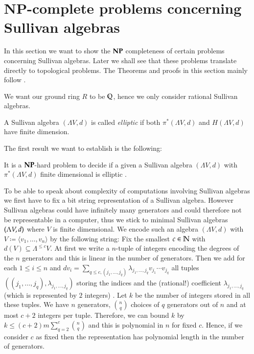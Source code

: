  \section{NP-complete problems concerning Sullivan algebras}
 
 In this section we want to show the 
 $\mathbf{NP}$ completeness of certain problems concerning Sullivan algebras. Later we shall see that these problems
 translate directly to topological problems. The Theorems and proofs in this section mainly follow  \cite{Lechuga2000}.
 
 We want our ground ring $R$ to be  $\mathbb{Q}$, hence we only consider rational Sullivan algebras.
 
 \begin{Definition}
  A Sullivan algebra $(\Lambda V, d)$ is called \emph{elliptic} if both $\pi^*(\Lambda V,d)$ and $H(\Lambda V,d)$ have
  finite dimension.
 \end{Definition}
 
 The first result we want to establish is the following:
 
 \begin{Theorem}
 \label{thm:DecidingEllipticityIsNpHard}
  It is a $\mathbf{NP}$-hard problem to decide if a given a Sullivan algebra $(\Lambda V,d)$ with $\pi^*(\Lambda V,d)$ finite dimensional 
  is elliptic . 
 \end{Theorem}
 
 \begin{Remark}
 \label{rem:CodingOfSullivanAlgebras}
  To be able to speak about complexity of computations involving Sullivan algebras we first have to fix a bit string 
  representation of a Sullivan algebra. However Sullivan algebras could have infinitely many generators and could therefore
  not be representable in a computer, thus we stick to minimal Sullivan algebras $(\Lambda V,d)$ where $V$ is finite dimensional. 
  We encode such an algebra $(\Lambda V, d)$ with $V \coloneqq \langle v_1, \ldots , v_n \rangle$
  by the following string: \newline
  Fix the smallest $c \in \mathbb{N}$ with $d(V) \subseteq \Lambda^{ \leq c} V$.
  At first we write a $n$-tuple of integers encoding the degrees of the $n$ generators and this is linear in the number
  of generators. Then we add for each $ 1 \leq i \leq n$
  and $d v_i = \sum_{q \leq c, (j_1, \ldots, j_q)} \lambda_{j_1, \ldots, j_q} v_{j_1} \cdots v_{j_q}$ all tuples 
  $(({j_1, \ldots, j_q}), \lambda_{j_1, \ldots, j_q})$ storing the indices and the (rational!) coefficient 
  $\lambda_{j_1, \ldots, j_q}$ (which is represented by $2$ integers)
  . Let $k$ be the number of integers stored in all these tuples. We have $n$ generators,
  ${ n \choose q}$ choices of $q$ generators out of $n$ and at most $c + 2$ integers per tuple. Therefore, we can bound $k$ by
  $k \leq (c + 2)m \sum_{q = 2}^c { n \choose q} $ and this is polynomial in $n$ for fixed $c$.
  Hence, if we consider $c$ as fixed then the representation has polynomial length in the number
  of generators.
  
 \end{Remark}
 

